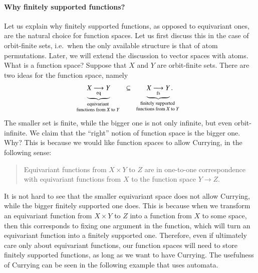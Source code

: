 \paragraph*{Why finitely supported functions?} Let us explain why finitely supported functions, as opposed to equivariant ones, are the natural choice for function spaces. Let us first discuss this in the case of orbit-finite sets, i.e.~when the only available structure is that of atom permutations. Later, we will extend the discussion to vector spaces with atoms. 
What is a function space?  Suppose that $X$ and $Y$ are orbit-finite sets. There are two ideas for the function space, namely
\begin{align*}
\myunderbrace{\eqfun X Y}{equivariant\\ functions from $X$ to $Y$}
\qquad \subseteq \qquad
\myunderbrace{\fsfun X Y}{finitely supported\\ functions from $X$ to $Y$}.
\end{align*}
The smaller set is finite, while the bigger one is not only infinite, but even orbit-infinite.  We claim that the ``right'' notion of function space is the bigger one. Why? This is because we would like function spaces to allow Currying, in the following sense: 
\begin{quote}
    Equivariant functions from $X \times Y$ to $Z$ are in one-to-one correspondence with equivariant functions from $X$ to the function space $Y \to Z$. 
\end{quote}
It is not hard to see that the smaller equivariant space does not allow Currying, while the bigger finitely supported one does. This is because 
when we transform an equivariant function from $X \times Y$ to $Z$ into a function from $X$ to some space, then this corresponds to fixing one argument in the function, which will turn an equivariant function into a finitely supported one. Therefore, even if ultimately care only about equivariant functions, our function spaces will need to store finitely supported functions, as long as we want to have Currying. The usefulness of Currying can be seen in the following example that uses automata. 

